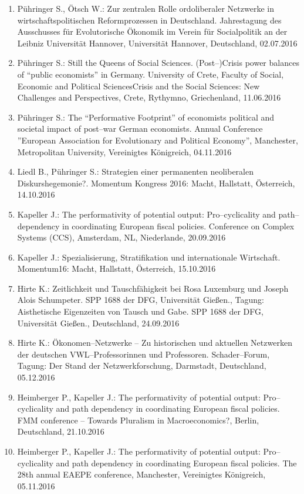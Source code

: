 \begin{enumerate}
	\item Pühringer S., Ötsch W.: Zur zentralen Rolle ordoliberaler Netzwerke in wirtschaftspolitischen Reformprozessen in Deutschland. Jahrestagung des Ausschusses für Evolutorische Ökonomik im Verein für Socialpolitik an der Leibniz Universität Hannover, Universität Hannover, Deutschland, 02.07.2016
	\item Pühringer S.: Still the Queens of Social Sciences. (Post--)Crisis power balances  of “public economists” in Germany. University of Crete, Faculty of Social, Economic and Political SciencesCrisis and the Social Sciences: New Challenges and Perspectives, Crete, Rythymno, Griechenland, 11.06.2016
	\item Pühringer S.: The “Performative Footprint” of economists political and societal impact of post--war German economists. Annual Conference ''European Association for Evolutionary and Political Economy'', Manchester, Metropolitan University, Vereinigtes Königreich, 04.11.2016
	\item Liedl B., Pühringer S.: Strategien einer permanenten neoliberalen Diskurshegemonie?. Momentum Kongress 2016: Macht, Hallstatt, Österreich, 14.10.2016
	\item Kapeller J.: The performativity of potential output: Pro--cyclicality and path--dependency in coordinating European fiscal policies. Conference on Complex Systems (CCS), Amsterdam, NL, Niederlande, 20.09.2016
	\item Kapeller J.: Spezialisierung, Stratifikation und internationale Wirtschaft. Momentum16: Macht, Hallstatt, Österreich, 15.10.2016
	\item Hirte K.: Zeitlichkeit und Tauschfähigkeit bei Rosa Luxemburg und Joseph Alois Schumpeter. SPP 1688 der DFG, Universität Gießen., Tagung: Aisthetische Eigenzeiten von Tausch und Gabe. SPP 1688 der DFG, Universität Gießen., Deutschland, 24.09.2016
	\item Hirte K.: Ökonomen--Netzwerke – Zu historischen und aktuellen Netzwerken der deutschen VWL--Professorinnen und Professoren. Schader--Forum, Tagung: Der Stand der Netzwerkforschung, Darmstadt, Deutschland, 05.12.2016
	\item Heimberger P., Kapeller J.: The performativity of potential output: Pro--cyclicality and path dependency in coordinating European fiscal policies. FMM conference -- Towards Pluralism in Macroeconomics?, Berlin, Deutschland, 21.10.2016
	\item Heimberger P., Kapeller J.: The performativity of potential output: Pro--cyclicality and path dependency in coordinating European fiscal policies. The 28th annual EAEPE conference, Manchester, Vereinigtes Königreich, 05.11.2016

\end{enumerate}
